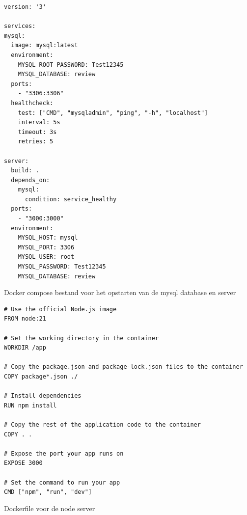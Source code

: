 \begin{listing}[H]
  \centering
  \begin{verbatim}
version: '3'

services:
mysql:
  image: mysql:latest
  environment:
    MYSQL_ROOT_PASSWORD: Test12345
    MYSQL_DATABASE: review
  ports:
    - "3306:3306"
  healthcheck:
    test: ["CMD", "mysqladmin", "ping", "-h", "localhost"]
    interval: 5s
    timeout: 3s
    retries: 5

server:
  build: .
  depends_on:
    mysql:
      condition: service_healthy
  ports:
    - "3000:3000"
  environment:
    MYSQL_HOST: mysql
    MYSQL_PORT: 3306
    MYSQL_USER: root
    MYSQL_PASSWORD: Test12345
    MYSQL_DATABASE: review
      \end{verbatim}
      \caption{\label{code:dockercompose}Docker compose bestand voor het opstarten van de mysql database en server}
\end{listing}

\begin{listing}[H]
  \centering
  \begin{verbatim}
# Use the official Node.js image
FROM node:21

# Set the working directory in the container
WORKDIR /app

# Copy the package.json and package-lock.json files to the container
COPY package*.json ./

# Install dependencies
RUN npm install

# Copy the rest of the application code to the container
COPY . .

# Expose the port your app runs on
EXPOSE 3000

# Set the command to run your app
CMD ["npm", "run", "dev"]
      \end{verbatim}
      \caption{\label{code:dockernode}Dockerfile voor de node server}
\end{listing}

